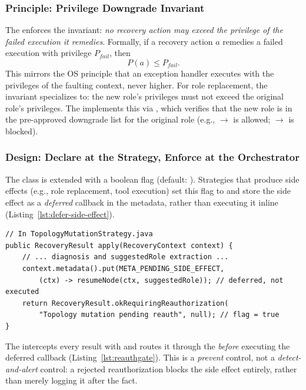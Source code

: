 \subsubsection{Principle: Privilege Downgrade Invariant}
The \reauthgate{} enforces the invariant: \emph{no recovery action may exceed the privilege of the failed execution it remedies}. Formally, if a recovery action $a$ remedies a failed execution with privilege $P_{fail}$, then
\[
P(a) \leq P_{fail}.
\]
This mirrors the OS principle that an exception handler executes with the privileges of the faulting context, never higher. For role replacement, the invariant specializes to: the new role's privileges must not exceed the original role's privileges. The  implements this via , which verifies that the new role is in the pre-approved downgrade list for the original role (e.g.,  $\rightarrow$  is allowed;  $\rightarrow$  is blocked).

\subsubsection{Design: Declare at the Strategy, Enforce at the Orchestrator}
The  class is extended with a boolean  flag (default: ). Strategies that produce side effects (e.g., role replacement, tool execution) set this flag to  and store the side effect as a \emph{deferred} callback in the  metadata, rather than executing it inline (Listing~\ref{lst:defer-side-effect}).

\begin{lstlisting}[caption={Deferring the side effect in \code{TopologyMutationStrategy}; the strategy declares reauthorization need but does not execute.},label={lst:defer-side-effect}]
// In TopologyMutationStrategy.java
public RecoveryResult apply(RecoveryContext context) {
    // ... diagnosis and suggestedRole extraction ...
    context.metadata().put(META_PENDING_SIDE_EFFECT,
        (ctx) -> resumeNode(ctx, suggestedRole)); // deferred, not executed
    return RecoveryResult.okRequiringReauthorization(
        "Topology mutation pending reauth", null); // flag = true
}
\end{lstlisting}

The  intercepts every result with  and routes it through the \reauthgate{} \emph{before} executing the deferred callback (Listing~\ref{lst:reauthgate}). This is a \emph{prevent} control, not a \emph{detect-and-alert} control: a rejected reauthorization blocks the side effect entirely, rather than merely logging it after the fact.

